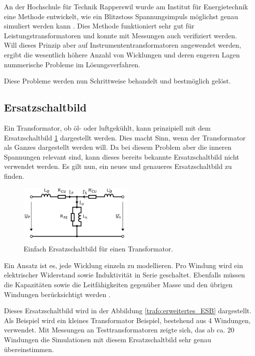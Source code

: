 \begin{refsection}
An der Hochschule für Technik Rapperswil wurde am Institut für Energietechnik eine Methode entwickelt, wie ein Blitzstoss Spannungsimpuls möglichst genau simuliert werden kann \cite{trafo:BILImpulse}. Dies Methode funktioniert sehr gut für Leistungstransformatoren und konnte mit Messungen auch verifiziert werden. 
Will dieses Prinzip aber auf Instrumententransformatoren angewendet werden, ergibt die wesentlich höhere Anzahl von Wicklungen und deren engeren Lagen nummerische Probleme im Lösungsverfahren. 

Diese Probleme werden nun Schrittweise behandelt und bestmöglich gelöst. 


\subsection{Ersatzschaltbild}
Ein Transformator, ob öl- oder luftgekühlt, kann prinzipiell mit dem Ersatzschaltbild \ref{trafo:einfaches_ESB} dargestellt werden. Dies macht Sinn, wenn der Transformator als Ganzes dargestellt werden will. Da bei diesem Problem aber die inneren Spannungen relevant sind, kann dieses bereits bekannte Ersatzschaltbild nicht verwendet werden. Es gilt nun, ein neues und genaueres Ersatzschaltbild zu finden. 

\begin{figure}
	\centering
	\includegraphics[width=0.5\textwidth]{trafo/Einfaches_ESB.png}
	\caption[Einfach Ersatzschaltbild für einen Transformator]{Einfach Ersatzschaltbild für einen Transformator.}
	\label{trafo:einfaches_ESB}
\end{figure}

Ein Ansatz ist es, jede Wicklung einzeln zu modellieren. Pro Windung wird ein elektrischer Widerstand sowie Induktivität in Serie geschaltet. Ebenfalls müssen die Kapazitäten sowie die Leitfähigkeiten gegenüber Masse und den übrigen Windungen berücksichtigt werden \cite{trafo:BILImpulse}. 

Dieses Ersatzschaltbild wird in der Abbildung \ref{trafo:erweitertes_ESB} dargestellt. Als Beispiel wird ein kleines Transformator Beispiel, bestehend aus 4 Windungen, verwendet. Mit Messungen an Testtransformatoren zeigte sich, das ab ca. 20 Windungen die Simulationen mit diesem Ersatzschaltbild sehr genau übereinstimmen. 


\end{refsection}
